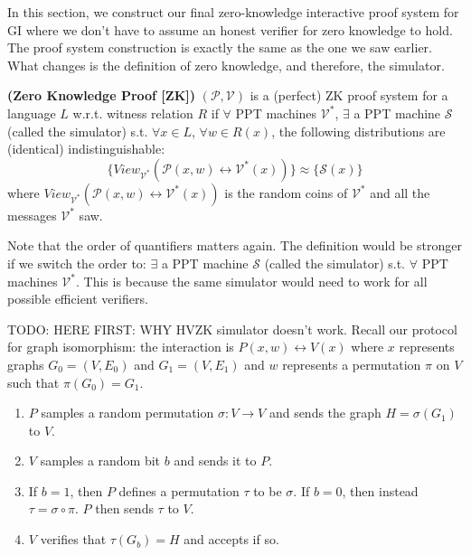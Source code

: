 In this section, we construct our final zero-knowledge interactive proof system for GI where we don't have to assume an honest verifier for zero knowledge to hold. The proof system construction is exactly the same as the one we saw earlier. What changes is the definition of zero knowledge, and therefore, the simulator. 

\begin{definition} {\normalfont\textbf{(Zero Knowledge Proof [ZK])}} 
	$(\mathcal{P},\mathcal{V})$ is a (perfect) ZK proof system for a language $L$ w.r.t. witness relation $R$ if $\forall$ PPT machines $\mathcal{V}^*$,
	$\exists$ a PPT machine $\mathcal{S}$ (called the simulator) s.t. $\forall x \in L$, $\forall w\in R(x)$, the following distributions are (identical) indistinguishable:
$$\{View_{\mathcal{V^*}}(\mathcal{P}(x,w) \leftrightarrow \mathcal{V^*}(x))\} \approx \{\mathcal{S}(x)\}$$
where $View_{\mathcal{V^*}}(\mathcal{P}(x,w) \leftrightarrow \mathcal{V^*}(x))$ is the random coins of $\mathcal{V^*}$ and all the messages $\mathcal{V^*}$ saw.
\end{definition}
\begin{remark}
	Note that the order of quantifiers matters again. The definition would be stronger if we switch the order to: $\exists$ a PPT machine $\mathcal{S}$ (called the simulator) s.t. $\forall$ PPT machines $\mathcal{V}^*$. This is because the same simulator would need to work for all possible efficient verifiers.
\end{remark}

TODO: HERE 
FIRST: WHY HVZK simulator doesn't work.
Recall our protocol for graph isomorphism: the interaction is $P(x,w) \leftrightarrow V(x)$ where $x$ represents graphs $G_0 = (V, E_0)$ and $G_1 = (V, E_1)$ and $w$ represents a permutation $\pi$ on $V$ such that $\pi (G_0) = G_1$.

\begin{enumerate}
\item $P$ samples a random permutation $\sigma: V \to V$ and sends the graph $H = \sigma(G_1)$ to $V$.

\item $V$ samples a random bit $b$ and sends it to $P$.

\item If $b = 1$, then $P$ defines a permutation $\tau$ to be $\sigma$. If $b = 0$, then instead $\tau = \sigma \circ \pi$. $P$ then sends $\tau$ to $V$.

\item $V$ verifies that $\tau(G_b) = H$ and accepts if so.

\end{enumerate}

